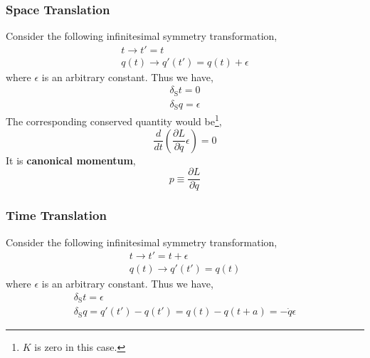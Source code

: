 \documentclass[12pt]{article}
\numberwithin{equation}{section}
\begin{document}
\subsubsection{Space Translation}
Consider the following infinitesimal symmetry transformation,
\begin{equation}
    \begin{split}
        t\rightarrow t' = t\\
        q(t)\rightarrow q'(t') = q(t) + \epsilon
    \end{split}
\end{equation}
where $\epsilon$ is an arbitrary constant.
Thus we have,
\begin{equation}
    \begin{split}
        \delta_{\text{S}}t =0\\
        \delta_{\text{S}}q = \epsilon
    \end{split}
\end{equation}
The corresponding conserved quantity would be\footnote{$K$ is zero in this case.},
\begin{equation}
    \frac{d}{dt}\left(\frac{\partial L}{\partial\dot{q}}\epsilon\right) = 0
\end{equation}
It is \textbf{canonical momentum},
\begin{equation}
    p\equiv\frac{\partial L}{\partial\dot{q}}
\end{equation}
\subsubsection{Time Translation}
Consider the following infinitesimal symmetry transformation,
\begin{equation}
    \begin{split}
        t\rightarrow t' = t+\epsilon\\
        q(t)\rightarrow q'(t') = q(t)
    \end{split}
\end{equation}
where $\epsilon$ is an arbitrary constant. Thus we have,
\begin{equation}
    \begin{split}
        \delta_{\text{S}}t = \epsilon\\
        \delta_{\text{S}}q = q'(t')-q(t') = q(t)-q(t+a) = -\dot{q}\epsilon
    \end{split}
\end{equation}
\end{document}
